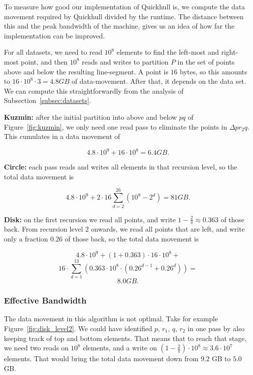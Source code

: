To measure how good our implementation of Quickhull is, we compute the data 
movement required by Quickhull divided by the runtime. The distance between
this and the peak bandwidth of the machine, gives us an
idea of how far the implementation can be improved.

For all datasets, we need to read $10^8$ elements to find the left-most
and right-most point, and then $10^8$ reads and writes to partition $P$
in the set of points above and below the resulting line-segment. A point
is $16$ bytes, so this amounts to $16 \cdot 10^8 \cdot 3 = 4.8 GB$ of 
data-movement. After that, it depends on the data set. We can compute this 
straightforwardly from the analysis of Subsection~\ref{subsec:datasets}.


\textbf{Kuzmin:} after the initial partition into above and below $pq$ of
Figure~\ref{fig:kuzmin}, we only need one read pass to eliminate the
points in $\Delta pr_2q$. This cumulates in a data movement of

$$4.8 \cdot 10^9 + 16 \cdot 10^8 = 6.4 GB.$$ 

\textbf{Circle:} each pass reads and writes all elements in that recursion
level, so the total data movement is

$$4.8 \cdot 10^9 + 2 \cdot 16 \sum_{d = 2}^{26}(10^8 - 2^d) = 81 GB.$$


\textbf{Disk:} on the first recursion we read all points, and write
$1 - \frac{2}{\pi} \approx 0.363$ of those back. From recursion level 2 onwards,
we read all points that are left, and write only a fraction $0.26$ of those
back, so the total data movement is

$$4.8 \cdot 10^9 + (1 + 0.363) \cdot 16 \cdot 10^8 + $$
$$16 \cdot \sum_{d = 1}^{13} 
\left(0.363 \cdot 10^8 \cdot (0.26^{d - 1} + 0.26^{d})\right) =$$
$$8.0 GB.$$

\subsubsection{Effective Bandwidth}

The data movement in this algorithm is not optimal. Take for example 
Figure~\ref{fig:disk_level2}. We could have identified $p$, $r_1$, $q$, $r_2$
in one pass by also keeping track of top and bottom elements. That means
that to reach that stage, we need two reads on $10^8$ elements,
and a write on 
$\left(1 - \frac{2}{\pi}\right) \cdot 10^8 \approx 3.6 \cdot 10^7$ elements.
That would bring the total data movement down from $9.2$ GB to $5.0$ GB.

